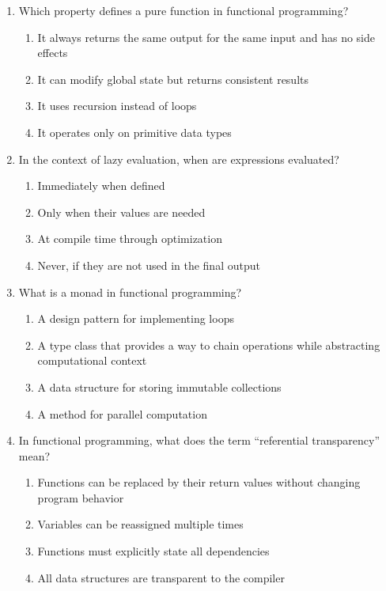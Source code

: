 \documentclass[11pt]{article}
\begin{document}
\begin{enumerate}[label=\textbf{\arabic*.}]

  \item Which property defines a pure function in functional programming?
  \begin{enumerate}[label=(\Alph*)]
    \item It always returns the same output for the same input and has no side effects
    \item It can modify global state but returns consistent results
    \item It uses recursion instead of loops
    \item It operates only on primitive data types
  \end{enumerate}

  \item In the context of lazy evaluation, when are expressions evaluated?
  \begin{enumerate}[label=(\Alph*)]
    \item Immediately when defined
    \item Only when their values are needed
    \item At compile time through optimization
    \item Never, if they are not used in the final output
  \end{enumerate}

  \item What is a monad in functional programming?
  \begin{enumerate}[label=(\Alph*)]
    \item A design pattern for implementing loops
    \item A type class that provides a way to chain operations while abstracting computational context
    \item A data structure for storing immutable collections
    \item A method for parallel computation
  \end{enumerate}

  \item In functional programming, what does the term ``referential transparency'' mean?
  \begin{enumerate}[label=(\Alph*)]
    \item Functions can be replaced by their return values without changing program behavior
    \item Variables can be reassigned multiple times
    \item Functions must explicitly state all dependencies
    \item All data structures are transparent to the compiler
  \end{enumerate}


\end{enumerate}
\end{document}
